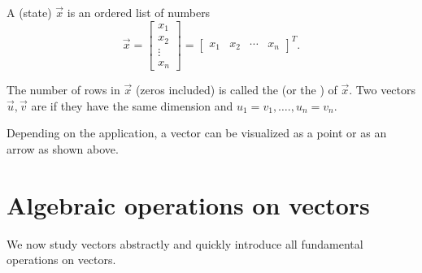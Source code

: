 \documentclass[../main.tex]{subfiles}
\begin{document}
\begin{definition}[vectors]
  A (state)  \(\vec{x}\) is an ordered list of numbers
  \[
    \vec{x} = 
    \begin{bmatrix}
      x_{1} \\ x_{2} \\ \vdots \\ x_{n}
    \end{bmatrix}
    = 
    \begin{bmatrix}
      x_{1} & x_{2} & \cdots & x_{n}
    \end{bmatrix}^{T}.
  \]

  The number of rows in \(\vec{x}\) (zeros included) is called the  (or the ) of \(\vec{x}\).  Two vectors \(\vec{u}, \vec{v}\) are  if they have the same dimension and \(u_{1} = v_{1}, \ldots., u_{n} = v_{n}\).
\end{definition}
Depending on the application, a vector can be visualized as a point or as an arrow as shown above.

\clearpage

\section{Algebraic operations on vectors}

We now study vectors abstractly and quickly introduce all fundamental operations on vectors. \medskip
\end{document}
